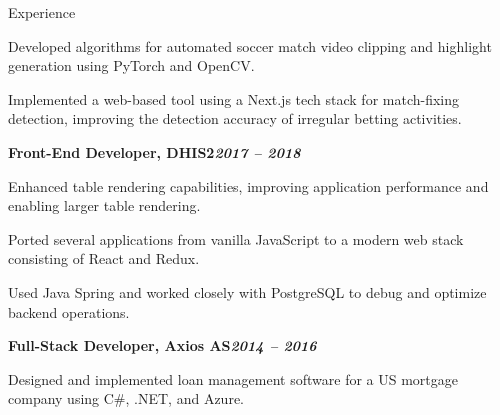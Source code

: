 \begin{rubric}{Experience}
\begin{compactitem}
    \item Developed algorithms for automated soccer match video clipping and highlight generation using PyTorch and OpenCV.
    \item Implemented a web-based tool using a Next.js tech stack for match-fixing detection, improving the detection accuracy of irregular betting activities.
    \vspace{-12pt}
\end{compactitem}
%
\entry*[]%
\textbf{Front-End Developer, DHIS2\hfill\textit{2017 -- 2018}} \par
    \begin{compactitem}
    \item Enhanced table rendering capabilities, improving application performance and enabling larger table rendering.
    \item Ported several applications from vanilla JavaScript to a modern web stack consisting of React and Redux.
    \item Used Java Spring and worked closely with PostgreSQL to debug and optimize backend operations.
    \vspace{-12pt}
\end{compactitem}
%
\entry*[]%
\textbf{Full-Stack Developer, Axios AS\hfill\textit{2014 -- 2016}} \par
\begin{compactitem}
    \item Designed and implemented loan management software for a US mortgage company using C\#, .NET, and Azure.
    \vspace{-12pt}
\end{compactitem}
%
\end{rubric}